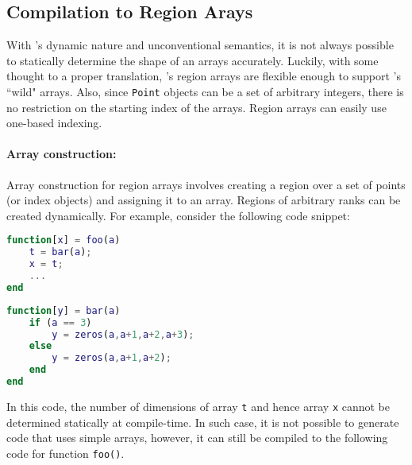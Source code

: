 \subsection{Compilation to Region Arays}

With \matlab's dynamic nature and unconventional semantics, it is not
always possible to statically determine the shape of an arrays 
accurately.  Luckily, with some thought to a proper translation, \xten's
region arrays are flexible enough to support \matlab's ``wild" arrays.
Also, since \verb|Point| objects can be a set of arbitrary integers,
there is no restriction on the starting index of the arrays. Region
arrays can easily use one-based indexing. 

\paragraph{Array construction:}
Array construction for region arrays involves creating a region over a set of
points (or index objects) and assigning it to an array. Regions of arbitrary
ranks can be created dynamically.  
For example, consider the following \matlab code snippet:

\begin{minipage}{0.4\linewidth}
\begin{lstlisting}[language=Matlab,numbers=none]                                
function[x] = foo(a)                                                        
    t = bar(a);  
    x = t;
    ...	                                                                    
end      
\end{lstlisting}  
\end{minipage}
\hfill
\hspace{.5cm}
\hfill
\begin{minipage}{0.5\linewidth}
\begin{lstlisting}[language=Matlab,numbers=none]                                
function[y] = bar(a)
    if (a == 3)
        y = zeros(a,a+1,a+2,a+3);
    else
        y = zeros(a,a+1,a+2);
    end
end		                                                           
\end{lstlisting}  
\end{minipage}

\noindent
In this code, the number of dimensions of array \verb|t| and hence array
\verb|x| cannot be determined statically at compile-time. In such case, it is 
not possible to generate \xten code that uses simple arrays, however, it can 
still be compiled to the following \xten code for function \verb|foo()|.

